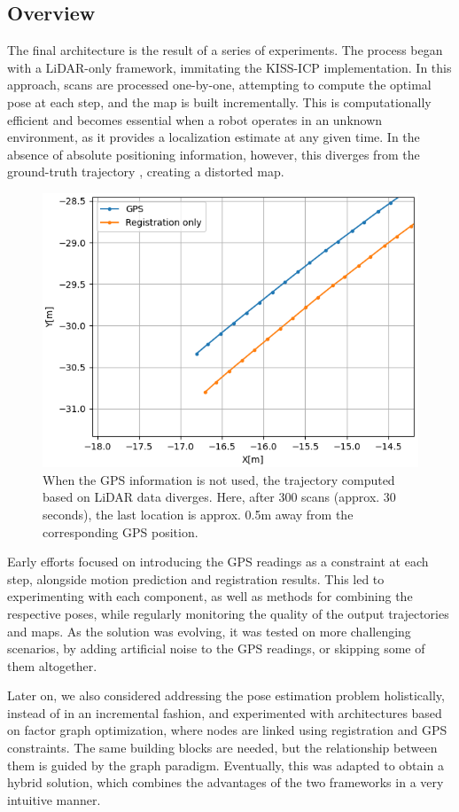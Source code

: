 \subsection{Overview}

The final architecture is the result of a series of experiments. The process began with a LiDAR-only framework, immitating the KISS-ICP \cite{vizzo2023ral} implementation.  In this approach, scans are processed one-by-one, attempting to compute the optimal pose at each step, and the map is built incrementally. This is computationally efficient and becomes essential when a robot operates in an unknown environment, as it provides a localization estimate at any given time. In the absence of absolute positioning information, however, this diverges from the ground-truth trajectory , creating a distorted map.

\begin{figure}[h]
	\centering
	\includegraphics[width=0.45\linewidth]{images/deviation_30s.png}
	\caption[Trajectory deviation from GPS]{When the GPS information is not used, the trajectory computed based on LiDAR data diverges. Here, after 300 scans (approx. 30 seconds), the last location is approx. 0.5m away from the corresponding GPS position.}
	\label{fig:deviation-no-gps}
\end{figure}

Early efforts focused on introducing the GPS readings as a constraint at each step, alongside motion prediction and registration results. This led to experimenting with each component, as well as methods for combining the respective poses, while regularly monitoring the quality of the output trajectories and maps. As the solution was evolving, it was tested on more challenging scenarios, by adding artificial noise to the GPS readings, or skipping some of them altogether.

Later on, we also considered addressing the pose estimation problem holistically, instead of in an incremental fashion, and experimented with architectures based on factor graph optimization, where nodes are linked using registration and GPS constraints. The same building blocks are needed, but the relationship between them is guided by the graph paradigm. Eventually, this was adapted to obtain a hybrid solution, which combines the advantages of the two frameworks in a very intuitive manner.


